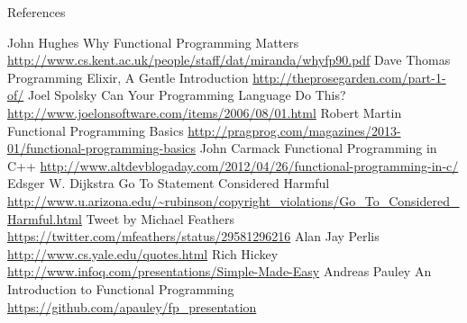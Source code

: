 \documentclass[mathserif]{beamer}
\begin{document}
\begin{frame}[allowframebreaks]{References}
  \begin{thebibliography}{10}
      John Hughes
      \newblock Why Functional Programming Matters
      \newblock \url{http://www.cs.kent.ac.uk/people/staff/dat/miranda/whyfp90.pdf}
      Dave Thomas
      \newblock Programming Elixir, A Gentle Introduction
      \newblock \url{http://theprosegarden.com/part-1-of/}
      Joel Spolsky
      \newblock Can Your Programming Language Do This?
      \newblock \url{http://www.joelonsoftware.com/items/2006/08/01.html}
      Robert Martin
      \newblock Functional Programming Basics
      \newblock \url{http://pragprog.com/magazines/2013-01/functional-programming-basics}
      John Carmack
      \newblock Functional Programming in C++
      \newblock \url{http://www.altdevblogaday.com/2012/04/26/functional-programming-in-c/}
      Edsger W. Dijkstra
      \newblock Go To Statement Considered Harmful
      \newblock \url{http://www.u.arizona.edu/~rubinson/copyright_violations/Go_To_Considered_Harmful.html}
      Tweet by Michael Feathers
      \newblock \url{https://twitter.com/mfeathers/status/29581296216}
      Alan Jay Perlis
      \newblock \url{http://www.cs.yale.edu/quotes.html}
      Rich Hickey
      \newblock \url{http://www.infoq.com/presentations/Simple-Made-Easy}
      Andreas Pauley
      \newblock An Introduction to Functional Programming
      \newblock \url{https://github.com/apauley/fp_presentation}
  \end{thebibliography}
\end{frame}
\end{document}
